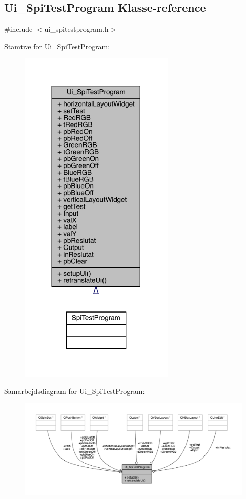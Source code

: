 \hypertarget{class_ui___spi_test_program}{}\subsection{Ui\+\_\+\+Spi\+Test\+Program Klasse-\/reference}
\label{class_ui___spi_test_program}


{\ttfamily \#include $<$ui\+\_\+spitestprogram.\+h$>$}



Stamtræ for Ui\+\_\+\+Spi\+Test\+Program\+:\nopagebreak
\begin{figure}[H]
\begin{center}
\leavevmode
\includegraphics[width=209pt]{d3/dcb/class_ui___spi_test_program__inherit__graph}
\end{center}
\end{figure}


Samarbejdsdiagram for Ui\+\_\+\+Spi\+Test\+Program\+:\nopagebreak
\begin{figure}[H]
\begin{center}
\leavevmode
\includegraphics[width=350pt]{d7/d07/class_ui___spi_test_program__coll__graph}
\end{center}
\end{figure}
